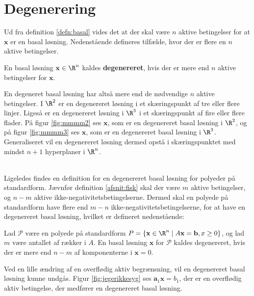 \section{Degenerering}
Ud fra definition \ref{defn:basal} vides det at der skal være $n$ aktive betingelser for at $\mathbf{x}$ er en basal løsning. 
Nedenstående defineres tilfælde, hvor der er flere en $n$ aktive betingelser. 
%
\begin{defn}{}{}
En basal løsning $\mathbf{x} \in \R^n$ kaldes \textbf{degenereret}, hvis der er mere end $n$ aktive betingelser for $\mathbf{x}$.
\end{defn}
\noindent
%
En degeneret basal løsning har altså mere end de nødvendige $n$ aktive betingelser.
% 
I $\R^2$ er en degenereret løsning i et skæringspunkt af tre eller flere linjer. 
Ligeså er en degenereret løsning i $\R^3$ i et skæringspunkt af fire eller flere flader. 
På figur \ref{fig:mmmm2} ses $\mathbf{x}$, som er en degenereret basal løsning i $\R^2$, og på figur  \ref{fig:mmmm3} ses $\mathbf{x}$, som er en degenereret basal løsning i $\R^3$.
Generaliseret vil en degenereret løsning dermed opstå i skæringspunktet med mindst $n+1$ hyperplaner i $\R^n$.
%
%
\begin{center}
$
\begin{array}{cc}
&

\end{array}
$
\end{center}
%
%
Ligeledes findes en definition for en degenereret basal løsning for polyeder på standardform. 
Jævnfør definition \ref{afsnit:fisk} skal der være $m$ aktive betingelser, og $n-m$ aktive ikke-negativitetsbetingelserne. Dermed skal en polyede på standardform have flere end $m-n$ ikke-negativitetsbetingelserne, for at have en degenereret basal løsning, hvilket er defineret nedenstående:
%
\begin{defn}{}{}
Lad $\mathcal{P}$ være en polyede på standardform
$P=\{ \mathbf{x} \in \R^n \mid A \mathbf{x}=\mathbf{b},x \geq 0 \}$, og lad $m$ være antallet af rækker i $A$.
En basal løsning $\mathbf{x}$ for $\mathcal{P}$ kaldes degenereret, hvis der er mere end $n-m$ af komponenterne i $\mathbf{x}=0$.
\end{defn}
\noindent
%
%
%
Ved en lille ændring af en overflødig aktiv begrænsning, vil en degenereret basal løsning kunne undgås. 
Figur \ref{fig:jegerikkesyg} ses $\mathbf{a}_1 \mathbf{x} = b_1$, der er en overflødig aktiv betingelse, der medfører en degenereret basal løsning.
